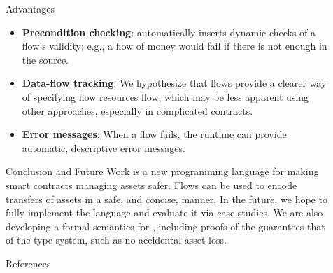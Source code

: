 \documentclass[usenames, dvipsnames, final]{beamer}
\newlength{\sepwidth}
\newlength{\colwidth}
\newcommand{\separatorcolumn}{\begin{column}{\sepwidth}\end{column}}
\begin{document}
\begin{frame}[t]
\begin{columns}[t]
\separatorcolumn

\begin{column}{\colwidth}
    \begin{alertblock}{Advantages}
        \begin{itemize}
            \item \textbf{Precondition checking}: \langName automatically inserts dynamic checks of a flow's validity; e.g., a flow of money would fail if there is not enough in the source. %
            \item \textbf{Data-flow tracking}: We hypothesize that flows provide a clearer way of specifying how resources flow, which may be less apparent using other approaches, especially in complicated contracts. %
            \item \textbf{Error messages}: When a flow fails, the \langName runtime can provide automatic, descriptive error messages.
        \end{itemize}
    \end{alertblock}

    \begin{block}{Conclusion and Future Work}
        \langName is a new programming language for making smart contracts managing assets safer.
        Flows can be used to encode transfers of assets in a safe, and concise, manner.
        In the future, we hope to fully implement the \langName language and evaluate it via case studies.
        We are also developing a formal semantics for \langName, including proofs of the guarantees that of the type system, such as no accidental asset loss.
    \end{block}

    \begin{block}{References}
        \nocite{*}
        \scriptsize{}
    \end{block}

\end{column}

\separatorcolumn
\end{columns}
\end{frame}
\end{document}
